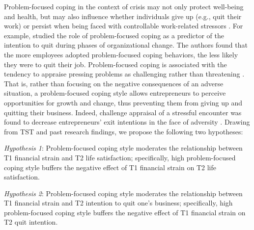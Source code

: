 \documentclass[man]{apa7}
\begin{document}
Problem-focused coping in the context of crisis may not only protect well-being and health, but may also influence whether individuals give up (e.g., quit their work) or persist when being faced with controllable work-related stressors \parencite[e.g.,][]{Zellars2004, Cunningham2006}. 
For example, \textcite{Cunningham2006} studied the role of problem-focused coping as a predictor of the intention to quit during phases of organizational change. 
The authors found that the more employees adopted problem-focused coping behaviors, the less likely they were to quit their job.
Problem-focused coping is associated with the tendency to appraise pressing problems as challenging rather than threatening \parencite[e.g.,][]{Folkman.1986}.
That is, rather than focusing on the negative consequences of an adverse situation, a problem-focused coping style allows entrepreneurs to perceive opportunities for growth and change, thus preventing them from giving up and quitting their business.
Indeed, challenge appraisal of a stressful encounter was found to decrease entrepreneurs' exit intentions in the face of adversity \parencite{Zhu2017}.
Drawing from TST and past research findings, we propose the following two hypotheses: \par 

\textit{Hypothesis 1}: Problem-focused coping style moderates the relationship between T1 financial strain and T2 life satisfaction; specifically, high problem-focused coping style buffers the negative effect of T1 financial strain on T2 life satisfaction. \par 

\textit{Hypothesis 2}: Problem-focused coping style moderates the relationship between T1 financial strain and T2 intention to quit one's business; specifically, high problem-focused coping style buffers the negative effect of T1 financial strain on T2 quit intention. \par 

\printbibliography
\end{document}
